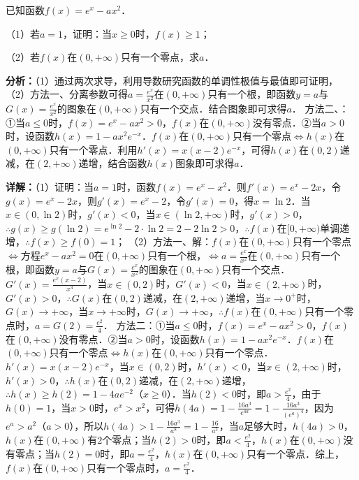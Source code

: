 \begin{question}[points=12]
已知函数$f(x)=e^x-ax^2$．

（1）若$a=1$，证明：当$x\ge 0$时，$f(x)\ge 1$；

（2）若$f(x)$在$(0,+\infty)$只有一个零点，求$a$．
\begin{solution}

\textbf{分析：}（1）通过两次求导，利用导数研究函数的单调性极值与最值即可证明，
（2）方法一、分离参数可得$a=\frac{e^x}{x^2}$在$(0,+\infty)$只有一个根，即函数$y=a$与$G(x)=\frac{e^x}{x^2}$的图象在$(0,+\infty)$只有一个交点．结合图象即可求得$a$．
方法二、：①当$a\le 0$时，$f(x)=e^x-ax^2>0$，$f(x)$在$(0,+\infty)$没有零点．②当$a>0$时，设函数$h(x)=1-ax^2e^{-x}$．$f(x)$在$(0,+\infty)$只有一个零点$\Leftrightarrow h(x)$在$(0,+\infty)$只有一个零点．利用$h'(x)=x(x-2)e^{-x}$，可得$h(x)$在$(0,2)$递减，在$(2,+\infty)$递增，结合函数$h(x)$图象即可求得$a$．

\textbf{详解：}（1）证明：当$a=1$时，函数$f(x)=e^x-x^2$．则$f'(x)=e^x-2x$，令$g(x)=e^x-2x$，则$g'(x)=e^x-2$，令$g'(x)=0$，得$x=\ln2$．当$x\in(0,\ln2)$时，$g'(x)<0$，当$x\in(\ln2,+\infty)$时，$g'(x)>0$，$\therefore g(x)\ge g(\ln2)=e^{\ln2}-2\cdot\ln2=2-2\ln2>0$，$\therefore f(x)$在$[0,+\infty)$单调递增，$\therefore f(x)\ge f(0)=1$；
（2）方法一、解：$f(x)$在$(0,+\infty)$只有一个零点$\Leftrightarrow$方程$e^x-ax^2=0$在$(0,+\infty)$只有一个根，$\Leftrightarrow a=\frac{e^x}{x^2}$在$(0,+\infty)$只有一个根，即函数$y=a$与$G(x)=\frac{e^x}{x^2}$的图象在$(0,+\infty)$只有一个交点．$G'(x)=\frac{e^x(x-2)}{x^3}$，当$x\in(0,2)$时，$G'(x)<0$，当$x\in(2,+\infty)$时，$G'(x)>0$，$\therefore G(x)$在$(0,2)$递减，在$(2,+\infty)$递增，当$x\to0^+$时，$G(x)\to+\infty$，当$x\to+\infty$时，$G(x)\to+\infty$，$\therefore f(x)$在$(0,+\infty)$只有一个零点时，$a=G(2)=\frac{e^2}{4}$．
方法二：①当$a\le 0$时，$f(x)=e^x-ax^2>0$，$f(x)$在$(0,+\infty)$没有零点．②当$a>0$时，设函数$h(x)=1-ax^2e^{-x}$．$f(x)$在$(0,+\infty)$只有一个零点$\Leftrightarrow h(x)$在$(0,+\infty)$只有一个零点．$h'(x)=x(x-2)e^{-x}$，当$x\in(0,2)$时，$h'(x)<0$，当$x\in(2,+\infty)$时，$h'(x)>0$，$\therefore h(x)$在$(0,2)$递减，在$(2,+\infty)$递增，$\therefore h(x)\ge h(2)=1-4ae^{-2}$（$x\ge0$）．当$h(2)<0$时，即$a>\frac{e^2}{4}$，由于$h(0)=1$，当$x>0$时，$e^x>x^2$，可得$h(4a)=1-\frac{16a^3}{e^{4a}}=1-\frac{16a^3}{(e^a)^4}$，因为$e^a>a^2$（$a>0$），所以$h(4a)>1-\frac{16a^3}{a^8}=1-\frac{16}{a^5}$，当$a$足够大时，$h(4a)>0$，$h(x)$在$(0,+\infty)$有$2$个零点；当$h(2)>0$时，即$a<\frac{e^2}{4}$，$h(x)$在$(0,+\infty)$没有零点；当$h(2)=0$时，即$a=\frac{e^2}{4}$，$h(x)$在$(0,+\infty)$只有一个零点．综上，$f(x)$在$(0,+\infty)$只有一个零点时，$a=\frac{e^2}{4}$．
\end{solution}
\end{question}

